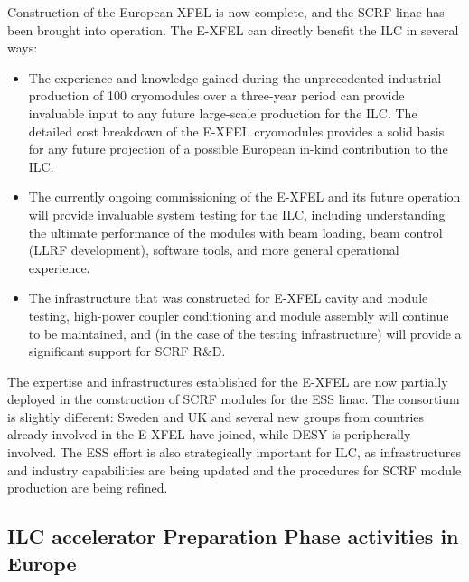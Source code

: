 \documentclass[%
 reprint,
 floatfix,
 amsmath,amssymb,
 aps,
]{revtex4-1}
\begin{document}
Construction of the European XFEL is now complete, and the SCRF linac has been brought into operation. The E-XFEL can directly benefit the ILC in several ways: 
\begin{itemize}
\item The experience and knowledge gained during the unprecedented industrial production of 100 cryomodules over a three-year period can provide 
invaluable input to any future large-scale production for the ILC. The detailed cost breakdown of the E-XFEL cryomodules 
provides a solid basis for any future projection of a possible European in-kind contribution to the ILC. 
\item 
The currently ongoing commissioning of the E-XFEL and its future operation will provide invaluable system testing for the ILC, 
including understanding the ultimate performance of the modules with beam loading, beam control (LLRF development), software tools, 
and more general operational experience. 
\item The infrastructure that was constructed for E-XFEL cavity and module
testing, high-power coupler conditioning and module assembly will continue to be maintained, and (in the case of the testing infrastructure) will provide a significant support for SCRF R\&D.
\end{itemize}

The expertise and infrastructures established for the E-XFEL are now partially deployed in the construction of SCRF modules for the ESS linac. 
The consortium is slightly different: Sweden and UK and several new groups from countries already involved in the E-XFEL have joined, while DESY is peripherally involved.
The ESS effort is also strategically important for ILC, as infrastructures and industry capabilities are being updated and the procedures for SCRF module production are being refined.

\subsection{ILC accelerator Preparation Phase activities in Europe ~\label{sec:acc:prephase}}
\end{document}
